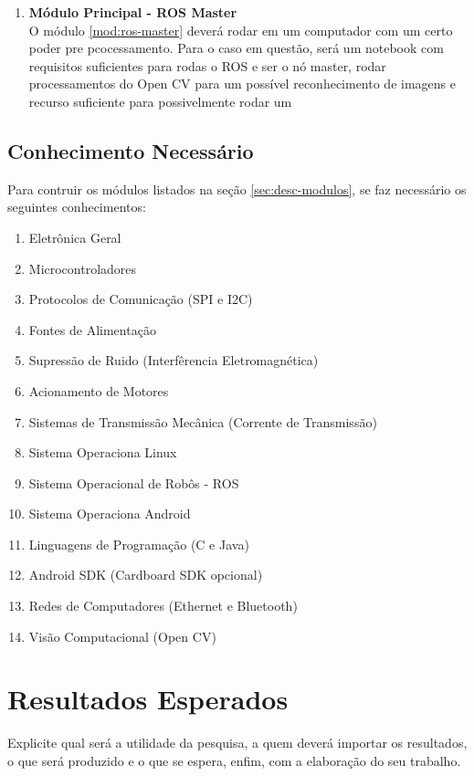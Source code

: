 \documentclass[a4paper,12pt]{article}
\begin{document}
\begin{enumerate}
\item \textbf{Módulo Principal - ROS Master\label{mod:ros-master}}\\
	O módulo \ref{mod:ros-master} deverá rodar em um computador com um certo poder pre pcocessamento. Para o caso em questão, será um notebook com requisitos suficientes para rodas o ROS e ser o nó master, rodar processamentos do Open CV para um possível reconhecimento de imagens e recurso suficiente para possivelmente rodar um 
\end{enumerate}

\subsection{Conhecimento Necessário}
	Para contruir os módulos listados na seção \ref{sec:desc-modulos}, se faz necessário os seguintes conhecimentos:
\begin{enumerate}[noitemsep]
	\item Eletrônica Geral
	\item Microcontroladores
	\item Protocolos de Comunicação (SPI e I2C)
	\item Fontes de Alimentação
	\item Supressão de Ruido (Interfêrencia Eletromagnética)
	\item Acionamento de Motores
	\item Sistemas de Transmissão Mecânica (Corrente de Transmissão)
	\item Sistema Operaciona Linux
	\item Sistema Operacional de Robôs - ROS
	\item Sistema Operaciona Android
	\item Linguagens de Programação (C e Java)
	\item Android SDK (Cardboard SDK opcional)
	\item Redes de Computadores (Ethernet e Bluetooth)
	\item Visão Computacional (Open CV)
\end{enumerate}

\section{Resultados Esperados}
Explicite qual será a utilidade da pesquisa, a quem deverá importar os resultados, o que será produzido e o que se espera, enfim, com a elaboração do seu trabalho. 
\end{document}
